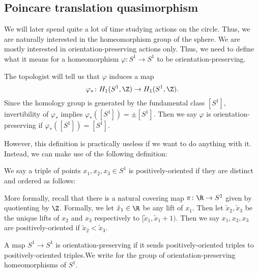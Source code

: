 \documentclass[a4paper]{article}
\newcommand\Homeo{\mathrm{Homeo}}
\begin{document}
\subsection{Poincare translation quasimorphism}
We will later spend quite a lot of time studying actions on the circle. Thus, we are naturally interested in the homeomorphism group of the sphere. We are mostly interested in orientation-preserving actions only. Thus, we need to define what it means for a homeomorphism $\varphi\colon S^1 \to S^1$ to be orientation-preserving.

The topologist will tell us that $\varphi$ induces a map
\[
  \varphi_*\colon H_1(S^1, \Z) \to H_1(S^1, \Z).
\]
Since the homology group is generated by the fundamental class $[S^1]$, invertibility of $\varphi_*$ implies $\varphi_*([S^1]) = \pm [S^1]$. Then we say $\varphi$ is orientation-preserving if $\varphi_*([S^1]) = [S^1]$.

However, this definition is practically useless if we want to do anything with it. Instead, we can make use of the following definition:

\begin{defi}
  We say a triple of points $x_1, x_2, x_3 \in S^1$ is positively-oriented if they are distinct and ordered as follows:
  \begin{center}
  \end{center}
  More formally, recall that there is a natural covering map $\pi\colon \R \to S^1$ given by quotienting by $\Z$. Formally, we let $\tilde{x}_1 \in \R$ be any lift of $x_1$. Then let $\tilde{x}_2, \tilde{x}_3$ be the unique lifts of $x_2$ and $x_3$ respectively to $[\tilde{x}_1, \tilde{x}_1 + 1)$. Then we say $x_1, x_2, x_3$ are positively-oriented if $\tilde{x}_2 < \tilde{x}_3$.
\end{defi}

\begin{defi}
  A map $S^1 \to S^1$ is orientation-preserving if it sends positively-oriented triples to positively-oriented triples.We write \term{$\Homeo^+(S^1)$} for the group of orientation-preserving homeomorphisms of $S^1$.
\end{defi}
\end{document}
